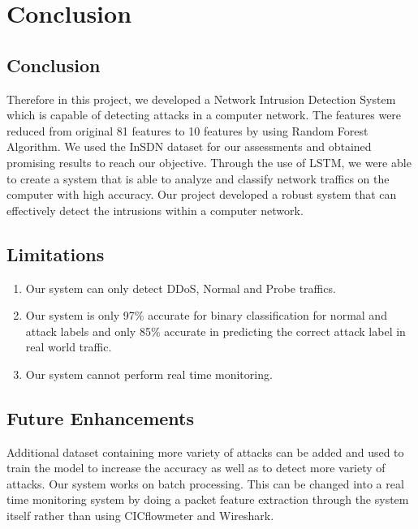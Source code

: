 \chapter{Conclusion}
\vspace{-18pt}
\section{Conclusion}
\vspace{-18pt}
Therefore in this project, we developed a Network Intrusion Detection System which is capable of detecting attacks in a computer network. The features were reduced from original 81 features to 10 features  by using Random Forest Algorithm. We used the InSDN dataset for our assessments and obtained promising results to reach our objective. Through the use of LSTM, we were able to create a system that is able to analyze and classify network traffics on the computer with high accuracy. Our project developed a robust system that can effectively detect the intrusions within a computer network.
\section{Limitations}
\vspace{-18pt}
\begin{enumerate}[label=\roman*.]
	\item Our system can only detect DDoS, Normal and Probe traffics.
	\item Our system is only 97\% accurate for binary classification for normal and attack labels and only 85\% accurate in predicting the correct attack label in real world traffic.
	\item Our system cannot perform real time monitoring.
\end{enumerate}
\section{Future Enhancements}
\vspace{-18pt}
Additional dataset containing more variety of attacks can be added and used to train the model to increase the accuracy as well as to detect more variety of attacks. Our system works on batch processing. This can be changed into a real time monitoring system by doing a packet feature extraction through the system itself rather than using CICflowmeter and Wireshark.
\newpage
\renewcommand\bibname{References} %

